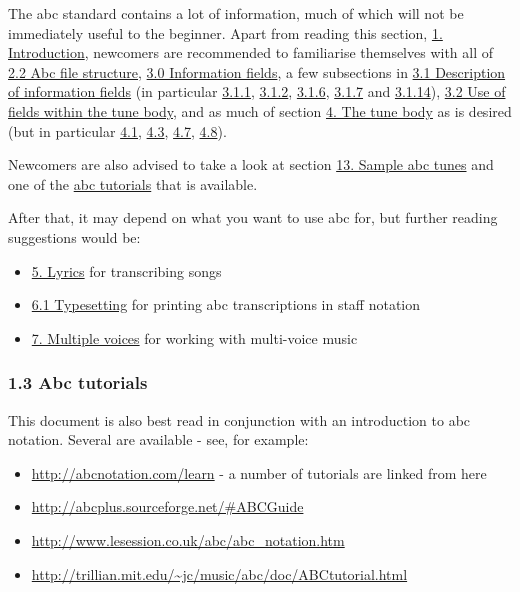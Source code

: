 The abc standard contains a lot of information, much of which will not
be immediately useful to the beginner. Apart from reading this section,
\protect\hyperlink{introduction}{1. Introduction}, newcomers are
recommended to familiarise themselves with all of
\protect\hyperlink{abc_file_structure}{2.2 Abc file structure},
\protect\hyperlink{information_fields}{3.0 Information fields}, a few
subsections in \protect\hyperlink{description_of_information_fields}{3.1
Description of information fields} (in particular
\protect\hyperlink{xreference_number}{3.1.1},
\protect\hyperlink{ttune_title}{3.1.2},
\protect\hyperlink{mmeter}{3.1.6},
\protect\hyperlink{lunit_note_length}{3.1.7} and
\protect\hyperlink{kkey}{3.1.14}),
\protect\hyperlink{use_of_fields_within_the_tune_body}{3.2 Use of fields
within the tune body}, and as much of section
\protect\hyperlink{the_tune_body}{4. The tune body} as is desired (but
in particular \protect\hyperlink{pitch}{4.1},
\protect\hyperlink{note_lengths}{4.3}, \protect\hyperlink{beams}{4.7},
\protect\hyperlink{repeat_bar_symbols}{4.8}).

Newcomers are also advised to take a look at section
\protect\hyperlink{sample_abc_tunes}{13. Sample abc tunes} and one of
the \protect\hyperlink{abc_tutorials}{abc tutorials} that is available.

After that, it may depend on what you want to use abc for, but further
reading suggestions would be:

\begin{itemize}
\item
  \protect\hyperlink{lyrics}{5. Lyrics} for transcribing songs
\item
  \protect\hyperlink{typesetting}{6.1 Typesetting} for printing abc
  transcriptions in staff notation
\item
  \protect\hyperlink{multiple_voices}{7. Multiple voices} for working
  with multi-voice music
\end{itemize}

\hypertarget{abc_tutorials}{\subsubsection{1.3 Abc
tutorials}\label{abc_tutorials}}

This document is also best read in conjunction with an introduction to
abc notation. Several are available - see, for example:

\begin{itemize}
\item
  \url{http://abcnotation.com/learn} - a number of tutorials are linked
  from here
\item
  \url{http://abcplus.sourceforge.net/\#ABCGuide}
\item
  \url{http://www.lesession.co.uk/abc/abc_notation.htm}
\item
  \url{http://trillian.mit.edu/~jc/music/abc/doc/ABCtutorial.html}
\end{itemize}

